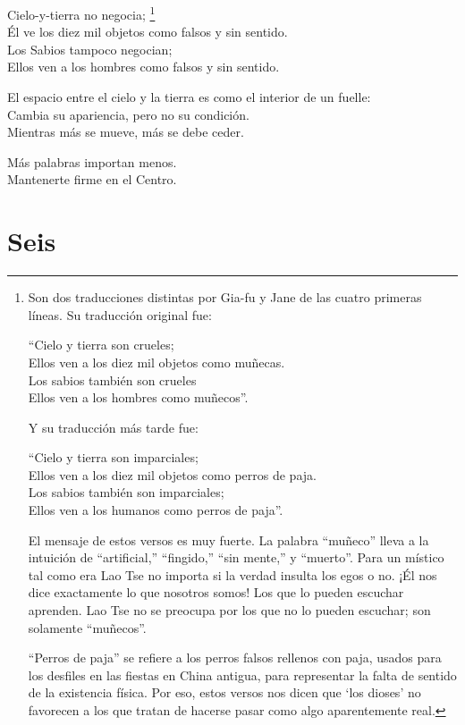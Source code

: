\documentclass[book,b5paper,hidelinks,final]{memoir}
\begin{document}
	Cielo-y-tierra no negocia;	\footnote{Son dos traducciones distintas por Gia-fu y Jane de las cuatro primeras
		líneas. Su traducción original fue:
		
		``Cielo y tierra son crueles;\\
		Ellos ven a los diez mil objetos como muñecas.\\
		Los sabios también son crueles\\
		Ellos ven a los hombres como muñecos''.
		
		Y su traducción más tarde fue:
		
		``Cielo y tierra son imparciales;\\
		Ellos ven a los diez mil objetos como perros de paja.\\
		Los sabios también son imparciales;\\
		Ellos ven a los humanos como perros de paja''.
	
	El mensaje de estos versos es muy fuerte. La palabra ``muñeco'' lleva a
	la intuición de ``artificial,'' ``fingido,'' ``sin mente,'' y
	``muerto''. Para un místico tal como era Lao Tse no importa si la verdad
	insulta los egos o no. ¡Él nos dice exactamente lo que nosotros somos!
	Los que lo pueden escuchar aprenden. Lao Tse no se preocupa por los que
	no lo pueden escuchar; son solamente ``muñecos''.
	
	``Perros de paja'' se refiere a los perros falsos rellenos con paja,
	usados para los desfiles en las fiestas en China antigua, para
	representar la falta de sentido de la existencia física. Por eso, estos
	versos nos dicen que `los dioses' no favorecen a los que tratan de
	hacerse pasar como algo aparentemente real.	
}\\
	Él ve los diez mil objetos como falsos y sin sentido.\\
	Los Sabios tampoco negocian;\\
	Ellos ven a los hombres como falsos y sin sentido.
	
	El espacio entre el cielo y la tierra es como el interior de un
	fuelle:\\
	Cambia su apariencia, pero no su condición.\\
	Mientras más se mueve, más se debe ceder.
	
	Más palabras importan menos.\\
	Mantenerte firme en el Centro.
	
	\chapter*{Seis}
	
\end{document}
